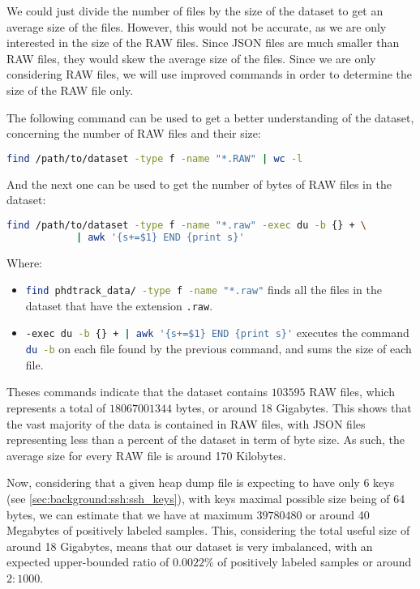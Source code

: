    We could just divide the number of files by the size of the dataset to get an average size of the files. However, this would not be accurate, as we are only interested in the size of the RAW files. Since JSON files are much smaller than RAW files, they would skew the average size of the files. Since we are only considering RAW files, we will use improved commands in order to determine the size of the RAW file only.

    The following command can be used to get a better understanding of the dataset, concerning the number of RAW files and their size:

    \begin{lstlisting}[caption={Find the number of RAW files in the dataset}, language=bash]
        find /path/to/dataset -type f -name "*.RAW" | wc -l
    \end{lstlisting}

    And the next one can be used to get the number of bytes of RAW files in the dataset:

    \begin{lstlisting}[caption={Find the number of bytes of RAW files in the dataset}, language=bash]
        find /path/to/dataset -type f -name "*.raw" -exec du -b {} + \
            | awk '{s+=$1} END {print s}'
    \end{lstlisting}

    Where:
    \begin{itemize}
        \item \lstinline[language=bash]!find phdtrack_data/ -type f -name "*.raw"! finds all the files in the dataset that have the extension \lstinline[language=bash]!.raw!.
        \item \lstinline[language=bash]!-exec du -b {} + | awk '{s+=$1} END {print s}'! executes the command \lstinline[language=bash]!du -b! on each file found by the previous command, and sums the size of each file.
    \end{itemize}

    Theses commands indicate that the dataset contains $ 103595 $ RAW files, which represents a total of $ 18067001344 $ bytes, or around 18 Gigabytes. This shows that the vast majority of the data is contained in RAW files, with JSON files representing less than a percent of the dataset in term of byte size. As such, the average size for every RAW file is around 170 Kilobytes. 

    Now, considering that a given heap dump file is expecting to have only 6 keys (see \ref{sec:background:ssh:ssh_keys}), with keys maximal possible size being of 64 bytes, we can estimate that we have at maximum $ 39780480 $ or around 40 Megabytes of positively labeled samples. This, considering the total useful size of around 18 Gigabytes, means that our dataset is very imbalanced, with an expected upper-bounded ratio of $ 0.0022\% $ of positively labeled samples or around $ 2:1000 $.

